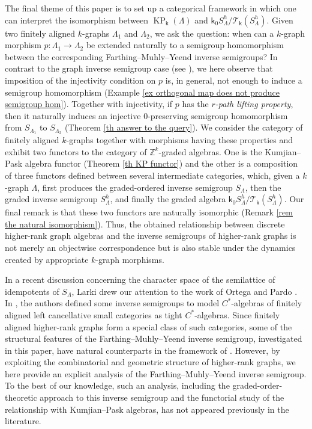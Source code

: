 \documentclass[a4paper,reqno,11pt]{amsart}
\numberwithin{equation}{section}
\theoremstyle{definition}
\theoremstyle{remark}
\newcommand{\KP}{\operatorname{KP}}
\begin{document}
The final theme of this paper is to set up a categorical framework in which one can interpret the isomorphism between $\KP_\mathsf{k}(\Lambda)$ and $\mathsf{k}_0S_\Lambda^h/{\mathcal{T}_\mathsf{k}(S_\Lambda^h)}$. Given two finitely aligned $k$-graphs $\Lambda_1$ and $\Lambda_2$, we ask the question: when can a $k$-graph morphism $p:\Lambda_1\longrightarrow \Lambda_2$ be extended naturally to a semigroup homomorphism between the corresponding Farthing--Muhly--Yeend inverse semigroups? In contrast to the graph inverse semigroup case (see \cite[Theorem 20]{Mesyan}), we here observe that imposition of the injectivity condition on $p$ is, in general, not enough to induce a semigroup homomorphism (Example \ref{ex orthogonal map does not produce semigroup hom}). Together with injectivity, if $p$ has the \emph{$r$-path lifting property}, then it naturally induces an injective $0$-preserving semigroup homomorphism from $S_{\Lambda_1}$ to $S_{\Lambda_2}$ (Theorem \ref{th answer to the query}). We consider the category of finitely aligned $k$-graphs together with morphisms having these properties and exhibit two functors to the category of $\mathbb{Z}^k$-graded algebras. One is the Kumjian--Pask algebra functor (Theorem \ref{th KP functor}) and the other is a composition of three functors defined between several intermediate categories, which, given a $k$-graph $\Lambda$, first produces the graded-ordered inverse semigroup $S_\Lambda$, then the graded inverse semigroup $S_\Lambda^h$, and finally the graded algebra $\mathsf{k}_0S_\Lambda^h/{\mathcal{T}_\mathsf{k}(S_\Lambda^h)}$. Our final remark is that these two functors are naturally isomorphic (Remark \ref{rem the natural isomorphism}). Thus, the obtained relationship between discrete higher-rank graph algebras and the inverse semigroups of higher-rank graphs is not merely an objectwise correspondence but is also stable under the dynamics created by appropriate $k$-graph morphisms. 

In a recent discussion concerning the character space of the semilattice of idempotents of $S_\Lambda$, Larki drew our attention to the work of Ortega and Pardo \cite{Ortega}. In \cite{Ortega}, the authors defined some inverse semigroups to model $C^*$-algebras of finitely aligned left cancellative small categories as tight $C^*$-algebras. Since finitely aligned higher-rank graphs form a special class of such categories, some of the structural features of the Farthing--Muhly--Yeend inverse semigroup, investigated in this paper, have natural counterparts in the framework of \cite{Ortega}. However, by exploiting the combinatorial and geometric structure of higher-rank graphs, we here provide an explicit analysis of the Farthing--Muhly--Yeend inverse semigroup. To the best of our knowledge, such an analysis, including the graded-order-theoretic approach to this inverse semigroup and the functorial study of the relationship with Kumjian--Pask algebras, has not appeared previously in the literature.
\end{document}
